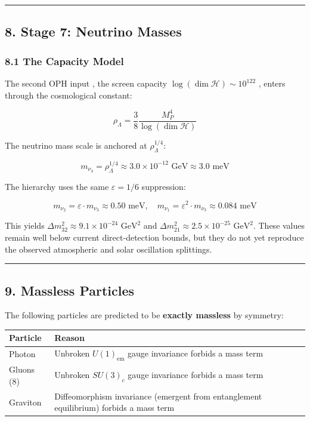 \begin{center}\rule{0.5\linewidth}{0.5pt}\end{center}

\subsection{8. Stage 7: Neutrino Masses}\label{8-stage-7-neutrino-masses}

\subsubsection{8.1 The Capacity Model}\label{81-the-capacity-model}

The second OPH input , the screen capacity \(\log(\dim\mathcal{H}) \sim 10^{122}\) , enters through the cosmological constant:

\[\rho_\Lambda = \frac{3}{8} \frac{M_P^4}{\log(\dim\mathcal{H})}\]

The neutrino mass scale is anchored at \(\rho_\Lambda^{1/4}\):

\[m_{\nu_3} = \rho_\Lambda^{1/4} \approx 3.0 \times 10^{-12} \text{ GeV} \approx 3.0 \text{ meV}\]

The hierarchy uses the same \(\varepsilon = 1/6\) suppression:

\[m_{\nu_2} = \varepsilon \cdot m_{\nu_3} \approx 0.50 \text{ meV}, \quad m_{\nu_1} = \varepsilon^2 \cdot m_{\nu_3} \approx 0.084 \text{ meV}\]

This yields \(\Delta m_{32}^2 \approx 9.1 \times 10^{-24} \text{ GeV}^2\) and \(\Delta m_{21}^2 \approx 2.5 \times 10^{-25} \text{ GeV}^2\). These values remain well below current direct-detection bounds, but they do not yet reproduce the observed atmospheric and solar oscillation splittings.

\begin{center}\rule{0.5\linewidth}{0.5pt}\end{center}

\subsection{9. Massless Particles}\label{9-massless-particles}

The following particles are predicted to be \textbf{exactly massless} by symmetry:

{\def\LTcaptype{none} %
\begin{longtable}[]{@{}>{\RaggedRight\arraybackslash}p{}>{\RaggedRight\arraybackslash}p{}@{}}
\toprule\noalign{}
Particle & Reason \\
\midrule\noalign{}
\endhead
\bottomrule\noalign{}
\endlastfoot
Photon & Unbroken \(U(1)_{\text{em}}\) gauge invariance forbids a mass term \\
Gluons (8) & Unbroken \(SU(3)_c\) gauge invariance forbids a mass term \\
Graviton & Diffeomorphism invariance (emergent from entanglement equilibrium) forbids a mass term \\
\end{longtable}
}

